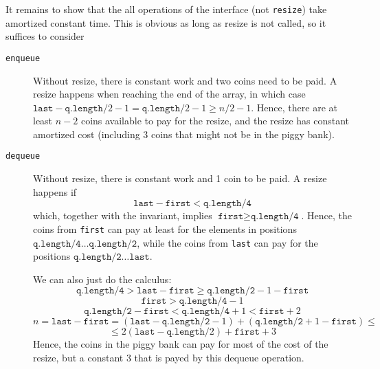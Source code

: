 \documentclass{tufte-handout}
\begin{document}
It remains to show that the all operations of the interface (not \texttt{resize}) take amortized constant time.
This is obvious as long as resize is not called, so it suffices to consider
\begin{description}
\item[\texttt{enqueue}]
  Without resize, there is constant work and two coins need to be paid.
  A resize happens when reaching the end of the array, in which case $\texttt{last} - \texttt{q.length}/2-1 = \texttt{q.length}/2-1 \ge n/2 -1$.
  Hence, there are at least $n-2$ coins available to pay for the resize, and the resize has constant amortized cost (including 3 coins that might not be in the piggy bank).
\pagebreak
\item[\texttt{dequeue}]
  Without resize, there is constant work and 1 coin to be paid.
  A resize happens if
  \[ \texttt{last} - \texttt{first} < \texttt{q.length/4} \]
  which, together with the invariant, implies $\texttt{first} \ge \texttt{q.length/4}$.
  Hence, the coins from \texttt{first} can pay at least for the elements in positions 
  $\texttt{q.length/4}\ldots \texttt{q.length/2}$, while the coins from \texttt{last} can pay for the positions   $\texttt{q.length/2}\ldots \texttt{last}$.

  We can also just do the calculus:
  \[ \texttt{q.length/4} > \texttt{last} - \texttt{first} \ge \texttt{q.length/2} -1 - \texttt{first} \]
  \[  \texttt{first} >  \texttt{q.length/4} -1 \]
  \[  \texttt{q.length/2} - \texttt{first}  <  \texttt{q.length/4} + 1 < \texttt{first} +2 \]
  \[ n = \texttt{last} - \texttt{first} = (\texttt{last} -\texttt{q.length/2} -1) + (\texttt{q.length/2} +1 - \texttt{first}) \le\]
  \[\le  2(\texttt{last} - \texttt{q.length}/2) + \texttt{first}  +3 \]
  Hence, the coins in the piggy bank can pay for most of the cost of the resize, but a constant 3 that is payed by this dequeue operation.
\end{description}
\end{document}
